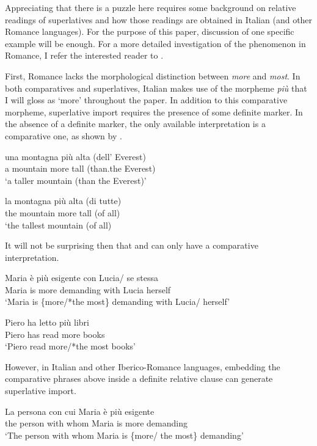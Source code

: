 \documentclass[output=paper,colorlinks,citecolor=brown,draft,draftmode]{langscibook}
\begin{document}
 Appreciating that there is a puzzle here requires some background on relative readings of superlatives and how those readings are obtained in Italian (and other Romance languages). For the purpose of this paper, discussion of one specific example will be enough. For a more detailed investigation of the phenomenon in Romance, I refer the interested reader  to \citet{loccioni2018phd}.

First, Romance lacks the morphological distinction between \textit{more} and \textit{most}. In both comparatives and superlatives, Italian makes use of the morpheme \textit{più} that I will gloss as `more' throughout the paper. In addition to this comparative morpheme, superlative import requires the presence of some definite marker. In the absence of a definite marker, the only available interpretation is a comparative one, as shown by .

\ea\label{comparative}
\gll una montagna più alta (dell' Everest)\\
a mountain more tall (than.the Everest)\\
\glt `a taller mountain (than the Everest)'
\z

\ea
\gll la montagna più alta (di tutte)\\
the mountain more tall (of all)\\
\glt `the tallest mountain (of all)\\
\z



It will not be surprising then that  and  can only have a comparative interpretation.


\ea\label{sententiallevel}
\gll Maria è più esigente con Lucia/ {se stessa}\\
Maria is more demanding with Lucia herself\\
\glt `Maria is \{more/*the most\} demanding with Lucia/ herself'
\z

\ea
\gll \label{piulibri}Piero ha letto più libri\\
Piero has read more books\\
\glt `Piero read more/*the most books'
\z

However, in Italian and other Iberico-Romance languages, embedding the comparative phrases above inside a definite relative clause can generate superlative import.


\ea
\gll \label{superlita}La persona con cui Maria è più esigente\\
the person with whom Maria is more demanding\\
\glt `The person with whom Maria is \{more/ the most\} demanding'
\z
\end{document}
